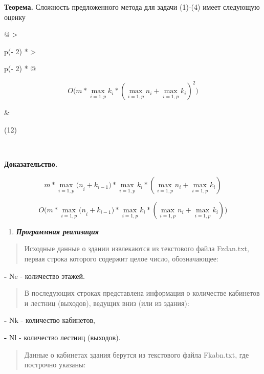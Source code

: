 \documentclass[
]{article}
\begin{document}
\textbf{Теорема.} Сложность предложенного метода для задачи (1)-(4)
имеет следующую оценку

\begin{longtable}[]{@{}
  >{\raggedright\arraybackslash}p{(\columnwidth - 2\tabcolsep) * }
  >{\raggedright\arraybackslash}p{(\columnwidth - 2\tabcolsep) * }@{}}
\toprule\noalign{}
\begin{minipage}[b]{\linewidth}\raggedright
\[O(m*\max_{i = 1,p}{k_{i}*{(\max_{i = 1,p}n_{i} + \max_{i = 1,p}k_{i})}^{2})}\]
\end{minipage} & \begin{minipage}[b]{\linewidth}\raggedright
(12)
\end{minipage} \\
\midrule\noalign{}
\endhead
\bottomrule\noalign{}
\endlastfoot
\end{longtable}

\textbf{Доказательство.}

\[m*\max_{i = 1,p}{{(n}_{i} + k_{i - 1})}*\max_{i = 1,p}{k_{i}*\left( \max_{i = 1,p}n_{i} + \max_{i = 1,p}k_{i} \right)}\]

\[O(m*\max_{i = 1,p}{{(n}_{i} + k_{i - 1})}*\max_{i = 1,p}{k_{i}*(\max_{i = 1,p}n_{i} + \max_{i = 1,p}k_{i}))}\]

\begin{enumerate}
\def\labelenumi{\arabic{enumi}.}
\setcounter{enumi}{2}
\item
  \emph{\textbf{Программная реализация}}
\end{enumerate}

\begin{quote}
Исходные данные о здании извлекаются из текстового файла Fzdan.txt,
первая строка которого содержит целое число, обозначающее:
\end{quote}

\textbf{-} Ne - количество этажей.

\begin{quote}
В последующих строках представлена информация о количестве кабинетов и
лестниц (выходов), ведущих вниз (или из здания):
\end{quote}

\textbf{-} Nk - количество кабинетов,

\textbf{-} Nl - количество лестниц (выходов).

\begin{quote}
Данные о кабинетах здания берутся из текстового файла Fkabn.txt, где
построчно указаны:
\end{quote}
\end{document}
